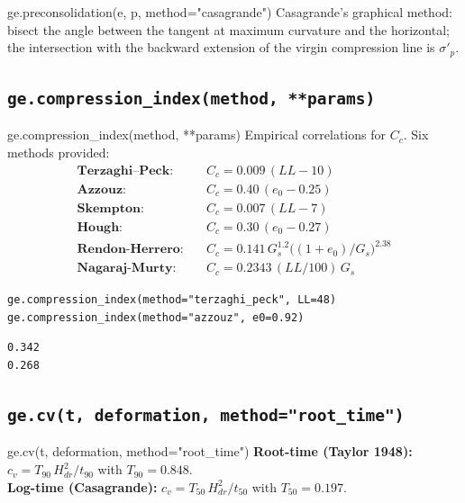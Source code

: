 \documentclass[11pt,a4paper,openany]{book}
\begin{document}
\begin{funcbox}{ge.preconsolidation(e, p, method="casagrande")}
Casagrande's graphical method: bisect the angle between the
tangent at maximum curvature and the horizontal; the
intersection with the backward extension of the virgin
compression line is $\sigma'_p$.
\end{funcbox}

\subsection{\texttt{ge.compression\_index(method, **params)}}

\begin{funcbox}{ge.compression\_index(method, **params)}
Empirical correlations for $C_c$. Six methods provided:
\begin{align*}
\textbf{Terzaghi--Peck:} &\quad C_c = 0.009\,(LL - 10) \\
\textbf{Azzouz:}         &\quad C_c = 0.40\,(e_0 - 0.25) \\
\textbf{Skempton:}       &\quad C_c = 0.007\,(LL - 7) \\
\textbf{Hough:}          &\quad C_c = 0.30\,(e_0 - 0.27) \\
\textbf{Rendon-Herrero:} &\quad C_c = 0.141\,G_s^{1.2}\bigl((1+e_0)/G_s\bigr)^{2.38} \\
\textbf{Nagaraj-Murty:}  &\quad C_c = 0.2343\,(LL/100)\,G_s
\end{align*}
\end{funcbox}

\begin{lstlisting}
ge.compression_index(method="terzaghi_peck", LL=48)
ge.compression_index(method="azzouz", e0=0.92)
\end{lstlisting}
\begin{lstlisting}[style=output]
0.342
0.268
\end{lstlisting}

\subsection{\texttt{ge.cv(t, deformation, method="root\_time")}}

\begin{funcbox}{ge.cv(t, deformation, method="root\_time")}
\textbf{Root-time (Taylor 1948):}
$c_v = T_{90}\,H_{dr}^2/t_{90}$ with $T_{90} = 0.848$.\\
\textbf{Log-time (Casagrande):}
$c_v = T_{50}\,H_{dr}^2/t_{50}$ with $T_{50} = 0.197$.
\end{funcbox}
\end{document}
